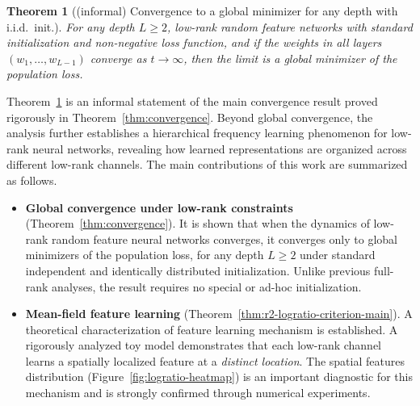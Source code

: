 \documentclass[nohyperref]{article}
\theoremstyle{plain}
\newtheorem{theorem}{Theorem}[section]
\theoremstyle{definition}
\theoremstyle{remark}
\begin{document}
\begin{theorem}[(informal) Convergence to a global minimizer for any depth with i.i.d.\ init.]
    \label{thm:convergence-informal}
    For any depth $L \ge 2$, low-rank random feature networks with standard initialization and non-negative loss function, and if the weights in all layers $(w_1,\ldots,w_{L-1})$ converge as $t\to\infty$, then the limit is a global minimizer of the population loss.
\end{theorem}
    

Theorem~\ref{thm:convergence-informal} is an informal statement of the main
convergence result proved rigorously in
Theorem~\ref{thm:convergence}. Beyond global convergence, the analysis further
establishes a hierarchical frequency learning phenomenon for low-rank neural
networks, revealing how learned representations are organized across different
low-rank channels.
The main contributions of this work are summarized as follows.

\begin{itemize}\setlength\itemsep{4pt}
	\item \textbf{Global convergence under low-rank constraints}
	(Theorem~\ref{thm:convergence}).  
	It is shown that when the dynamics of low-rank random feature neural networks converges, it converges only to global minimizers of the population loss, for any depth
	$L \ge 2$ under standard independent and identically distributed
	initialization.
	Unlike previous full-rank analyses, the result requires no special or
	ad-hoc initialization.

	\item \textbf{Mean-field feature learning}
	(Theorem~\ref{thm:r2-logratio-criterion-main}).  
	A theoretical characterization of feature learning mechanism is established.
	A rigorously analyzed toy model demonstrates that each low-rank channel
	learns a spatially localized feature at a \emph{distinct location}.
	The spatial features distribution (Figure~\ref{fig:logratio-heatmap}) is an important
	diagnostic for this mechanism and is strongly confirmed through numerical
	experiments.
\end{itemize}

\end{document}
